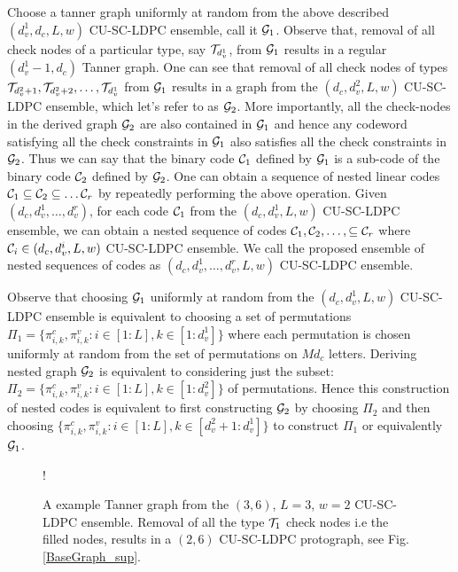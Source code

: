 \documentclass[journal,draftcls,onecolumn,12pt,twoside]{IEEEtran}
\begin{document}
Choose a tanner graph uniformly at random from the above described $(d_{v}^{1},d_{c},L,w)$ CU-SC-LDPC ensemble, call it $\mathcal{G}_{1}$. Observe that, removal of all check nodes of a particular type, say $\mathcal{T}_{d_{v}^{1}}$, from $\mathcal{G}_{1}$ results in a regular $(d_{v}^{1}-1,d_{c})$ Tanner graph. One can see that removal of all check nodes of types $\mathcal{T}_{d_{v}^{2}+1},\mathcal{T}_{d_{v}^{2}+2},\ldots, \mathcal{T}_{d_{v}^1} $ from $\mathcal{G}_{1}$ results in a graph from the $(d_{c},d_{v}^{2},L,w)$ CU-SC-LDPC ensemble, which let's refer to as $\mathcal{G}_{2}$. More importantly, all the check-nodes in the derived graph $\mathcal{G}_{2}$ are also contained in $\mathcal{G}_{1}$ and hence any codeword satisfying all the check constraints in $\mathcal{G}_{1}$ also satisfies all the check constraints in $\mathcal{G}_{2}$. Thus we can say that the binary code $\mathcal{C}_{1}$ defined by $\mathcal{G}_{1}$ is a sub-code of the binary code $\mathcal{C}_{2}$ defined by $\mathcal{G}_{2}$. One can obtain a sequence of nested linear codes $\mathcal{C}_1\subseteq\mathcal{C}_2\subseteq\ldots\mathcal{C}_r$ by repeatedly performing the above operation. Given $(d_{c},d_{v}^{1},\ldots,d_{v}^{r})$, for each code $\mathcal{C}_{1}$ from the $(d_{c},d_{v}^{1},L,w)$ CU-SC-LDPC ensemble, we can obtain a nested sequence of codes $\mathcal{C}_1,\mathcal{C}_2,\ldots,\subseteq\mathcal{C}_r$ where $\mathcal{C}_{i} \in (d_{c},d_{v}^{i},L,w)$ CU-SC-LDPC ensemble.  We call the proposed ensemble of nested sequences of codes as $(d_{c},d_{v}^{1},\ldots,d_{v}^{r},L,w)$ CU-SC-LDPC ensemble. 

\begin{Remark}\label{Rmk:EquivNestedConstr1}
Observe that choosing $\mathcal{G}_{1}$ uniformly at random from the $(d_{c},d_{v}^{1},L,w)$ CU-SC-LDPC ensemble is equivalent to choosing a set of permutations $\Pi_{1}=\{\pi_{i,k}^{c},\pi_{i,k}^{v}: i\in[1:L],k\in[1:d_{v}^{1}]\}$ where each permutation is chosen uniformly at random from the set of permutations on $Md_{c}$ letters. Deriving nested graph $\mathcal{G}_{2}$ is equivalent to considering just the subset: $\Pi_{2}=\{\pi_{i,k}^{c},\pi_{i,k}^{v}: i\in[1:L],k\in[1:d_{v}^{2}]\}$ of permutations. Hence this construction of nested codes is equivalent to first constructing $\mathcal{G}_{2}$ by choosing $\Pi_{2}$ and then choosing $\{\pi_{i,k}^{c},\pi_{i,k}^{v}: i\in[1:L], k\in[d_{v}^{2}+1:d_{v}^{1}]\}$ to construct $\Pi_{1}$ or equivalently $\mathcal{G}_{1}$.
\end{Remark}

\begin{figure}[t]
\centering
\resizebox {0.7\columnwidth} {!} {

}
\caption{A example Tanner graph from the $(3,6)$, $L=3$, $w=2$ CU-SC-LDPC ensemble. Removal of all the type $\mathcal{T}_{1}$ check nodes i.e the filled nodes, results in a $(2,6)$ CU-SC-LDPC protograph, see Fig.\ref{BaseGraph_sup}. }
\label{Basegraph}
\end{figure}
\end{document}
